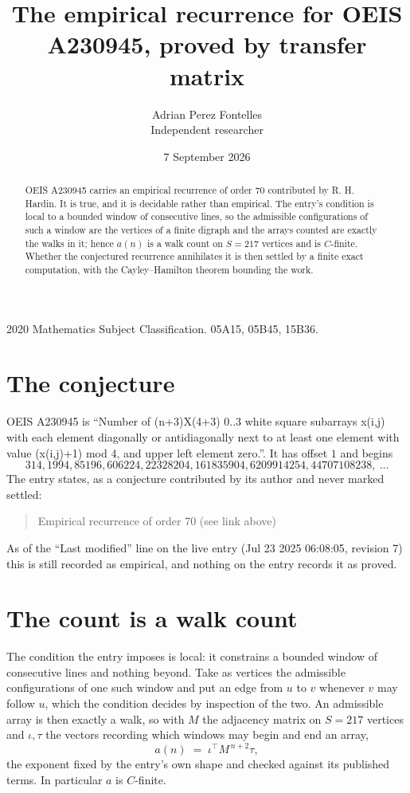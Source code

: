 \documentclass[11pt,a4paper]{article}
\title{The empirical recurrence for OEIS A230945, proved by transfer matrix}
\author{Adrian Perez Fontelles\\ \small Independent researcher}
\date{7 September 2026}
\theoremstyle{plain}
\theoremstyle{definition}
\begin{document}
\maketitle

\begin{abstract}
OEIS A230945 carries an empirical recurrence of order $70$ contributed by R. H. Hardin. It is
true, and it is decidable rather than empirical. The entry's condition is local to a bounded window of consecutive lines, so
the admissible configurations of such a window are the vertices of a finite digraph and the
arrays counted are exactly the walks in it; hence $a(n)$ is a walk count on $S=217$ vertices
and is $C$-finite. Whether the conjectured recurrence annihilates it is then settled by a
finite exact computation, with the Cayley--Hamilton theorem bounding the work.
\end{abstract}

\noindent\small 2020 Mathematics Subject Classification. 05A15, 05B45, 15B36.\normalsize

\section{The conjecture}

OEIS A230945 is ``Number of (n+3)X(4+3) 0..3 white square subarrays x(i,j) with each element diagonally or antidiagonally next to at least one element with value (x(i,j)+1) mod 4, and upper left element zero.''. It has offset $1$ and begins
\[
314, 1994, 85196, 606224, 22328204, 161835904, 6209914254, 44707108238,\ \dots
\]
The entry states, as a conjecture contributed by its author and never marked settled:
\begin{quote}
Empirical recurrence of order 70 (see link above)
\end{quote}
As of the ``Last modified'' line on the live entry (Jul 23 2025 06:08:05, revision 7) this is still
recorded as empirical, and nothing on the entry records it as proved.

\section{The count is a walk count}

The condition the entry imposes is local: it constrains a bounded window of consecutive lines and nothing beyond. Take as
vertices the admissible configurations of one such window and put an edge from $u$ to $v$
whenever $v$ may follow $u$, which the condition decides by inspection of the two. An
admissible array is then exactly a walk, so with $M$ the adjacency matrix on $S=217$ vertices
and $\iota,\tau$ the vectors recording which windows may begin and end an array,
\[
a(n)\;=\;\iota^{\!\top}M^{\,n+2}\tau ,
\]
the exponent fixed by the entry's own shape and checked against its published terms. In
particular $a$ is $C$-finite.
\end{document}
